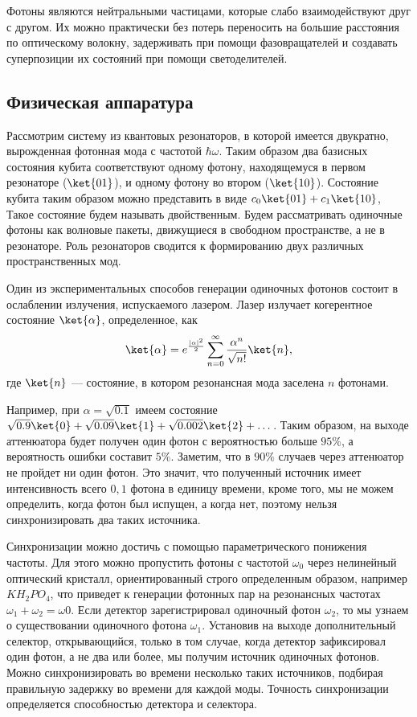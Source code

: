 Фотоны являются нейтральными частицами, которые слабо взаимодействуют друг с
другом. Их можно практически без потерь переносить на большие расстояния по
оптическому волокну, задерживать при помощи фазовращателей и создавать
суперпозиции их состояний при помощи светоделителей.

\subsection{Физическая аппаратура}

Рассмотрим систему из квантовых резонаторов, в которой имеется двукратно,
вырожденная фотонная мода с частотой $\hbar\omega$. Таким образом два базисных
состояния кубита соответствуют одному фотону, находящемуся в первом резонаторе
($\ket{01}$), и одному фотону во втором ($\ket{10}$). Состояние кубита таким
образом можно представить в виде $c_0\ket{01} + c_1\ket{10}$, Такое состояние
будем называть двойственным. Будем рассматривать одиночные фотоны как волновые
пакеты, движущиеся в свободном пространстве, а не в резонаторе. Роль
резонаторов сводится к формированию двух различных пространственных мод.

Один из экспериментальных способов генерации одиночных фотонов состоит в
ослаблении излучения, испускаемого лазером. Лазер излучает когерентное
состояние $\ket{\alpha}$, определенное, как
\begin{equation}
  \ket{\alpha} = e^{\frac{|\alpha|^2}{2}} 
  \sum_{n=0}^\infty \frac{\alpha^n}{\sqrt{n!}}\ket{n},
\end{equation}
где $\ket{n}$ --- состояние, в котором резонансная мода заселена $n$ фотонами.

Например, при $\alpha = \sqrt{0.1}$ имеем состояние $\sqrt{0.9}\ket{0} +
\sqrt{0.09}\ket{1} + \sqrt{0.002}\ket{2} + \dots$. Таким образом, на выходе
аттенюатора будет получен один фотон с вероятностью больше $95\%$, а
вероятность ошибки составит $5\%$. Заметим, что в $90\%$ случаев через
аттенюатор не пройдет ни один фотон. Это значит, что полученный источник имеет
интенсивность всего $0,1$ фотона в единицу времени, кроме того, мы не можем
определить, когда фотон был испущен, а когда нет, поэтому нельзя
синхронизировать два таких источника.

Синхронизации можно достичь с помощью параметрического понижения частоты. Для
этого можно пропустить фотоны с частотой $\omega_0$ через нелинейный оптический
кристалл, ориентированный строго определенным образом, например $KH_2PO_4$, что
приведет к генерации фотонных пар на резонансных частотах $\omega_1 + \omega_2
= \omega0$. Если детектор зарегистрировал одиночный фотон $\omega_2$, то мы
узнаем о существовании одиночного фотона $\omega_1$. Установив на выходе
дополнительный селектор, открывающийся, только в том случае, когда детектор
зафиксировал один фотон, а не два или более, мы получим источник одиночных
фотонов. Можно синхронизировать во времени несколько таких источников, подбирая
правильную задержку во времени для каждой моды. Точность синхронизации
определяется способностью детектора и селектора.

